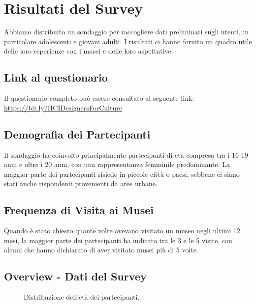 \documentclass{article}
\begin{document}
\section{Risultati del Survey}

Abbiamo distribuito un sondaggio per raccogliere dati preliminari sugli utenti, in particolare adolescenti e giovani adulti. I risultati ci hanno fornito un quadro utile delle loro esperienze con i musei e delle loro aspettative.

\subsection{Link al questionario}

Il questionario completo può essere consultato al seguente link: \url{https://bit.ly/HCIDesignersForCulture}

\subsection{Demografia dei Partecipanti}

Il sondaggio ha coinvolto principalmente partecipanti di età compresa tra i 16-19 anni e oltre i 20 anni, con una rappresentanza femminile predominante. La maggior parte dei partecipanti risiede in piccole città o paesi, sebbene ci siano stati anche rispondenti provenienti da aree urbane.

\subsection{Frequenza di Visita ai Musei}

Quando è stato chiesto quante volte avevano visitato un museo negli ultimi 12 mesi, la maggior parte dei partecipanti ha indicato tra le 3 e le 5 visite, con alcuni che hanno dichiarato di aver visitato musei più di 5 volte.

\subsection{Overview - Dati del Survey}

\begin{figure}[h]
    \centering
    \caption{Distribuzione dell'età dei partecipanti.}
\end{figure}
\end{document}
